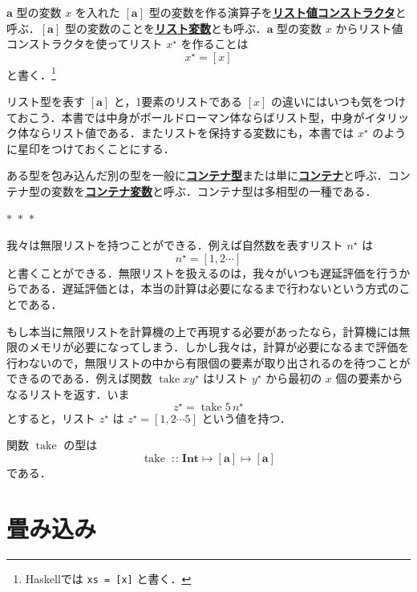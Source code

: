 \documentclass[a4paper,twocolumn]{jsbook}
\newcommand{\separator}{\begin{center}$*$~$*$~$*$\end{center}}
\newcommand{\programminglanguage}[1]{\textsf{#1}}
\newcommand{\haskell}{\programminglanguage{Haskell}}
\newcommand{\keyword}[1]{{\underline{\textbf{#1}}}}
\newcommand{\code}[1]{\texttt{#1}}
\newcommand{\mEmptyList}{{[\,]}}
\newcommand{\mSpecialFunc}[1]{\mathrm{#1}}
\DeclareMathOperator{\mTake}{\mSpecialFunc{take}}
\DeclareMathOperator{\mAppend}{\oplus}
\DeclareMathOperator{\mIn}{{:\!:}}
\DeclareMathOperator{\mMapsTo}{\mapsto}
\newcommand{\mType}[1]{\mathbf{#1}}
\newcommand{\mIntType}{\mType{Int}}
\newcommand{\mListType}[1]{[\mType{#1}]}
\newcommand{\mListWith}[1]{\left[#1\right]}
\newcommand{\mTupleWith}[1]{\left(#1\right)}
\newcommand{\mList}[1]{{#1}^\mathrm{\star}}
\newcommand{\mProj}[2]{#1\mMapsTo#2}
\begin{document}
$\mType{a}$ 型の変数 $x$ を入れた $\mListType{a}$ 型の変数を作る演算子を\keyword{リスト値コンストラクタ}と呼ぶ．$\mListType{a}$ 型の変数のことを\keyword{リスト変数}とも呼ぶ．$\mType{a}$ 型の変数 $x$ からリスト値コンストラクタを使ってリスト $\mList{x}$ を作ることは
\begin{equation}
\mList{x}=\mListWith{x}
\end{equation}
と書く．\footnote{\haskell では \code{xs = [x]} と書く．}

リスト型を表す $\mListType{a}$ と，1要素のリストである $\mListWith{x}$ の違いにはいつも気をつけておこう．本書では中身がボールドローマン体ならばリスト型，中身がイタリック体ならリスト値である．またリストを保持する変数にも，本書では $\mList{x}$ のように星印をつけておくことにする．

ある型を包み込んだ別の型を一般に\keyword{コンテナ型}または単に\keyword{コンテナ}と呼ぶ．コンテナ型の変数を\keyword{コンテナ変数}と呼ぶ．コンテナ型は多相型の一種である．


\separator

我々は無限リストを持つことができる．例えば自然数を表すリスト $\mList{n}$ は
\begin{equation*}
\mList{n}=\mListWith{1,2\dotsb}
\end{equation*}
と書くことができる．無限リストを扱えるのは，我々がいつも遅延評価を行うからである．遅延評価とは，本当の計算は必要になるまで行わないという方式のことである．

もし本当に無限リストを計算機の上で再現する必要があったなら，計算機には無限のメモリが必要になってしまう．しかし我々は，計算が必要になるまで評価を行わないので，無限リストの中から有限個の要素が取り出されるのを待つことができるのである．例えば関数 $\mTake x\mList{y}$ はリスト $\mList{y}$ から最初の $x$ 個の要素からなるリストを返す．いま
\begin{equation*}
\mList{z}=\mTake5\,\mList{n}
\end{equation*}
とすると，リスト $\mList{z}$ は $\mList{z}=\mListWith{1,2\dotsb5}$ という値を持つ．

関数 $\mTake$ の型は
\begin{equation}
\mTake\mIn{}\mProj{\mIntType}{\mProj{\mListType{a}}{\mListType{a}}}
\end{equation}
である．

\section{畳み込み}
\label{sec:convolution}
\end{document}
